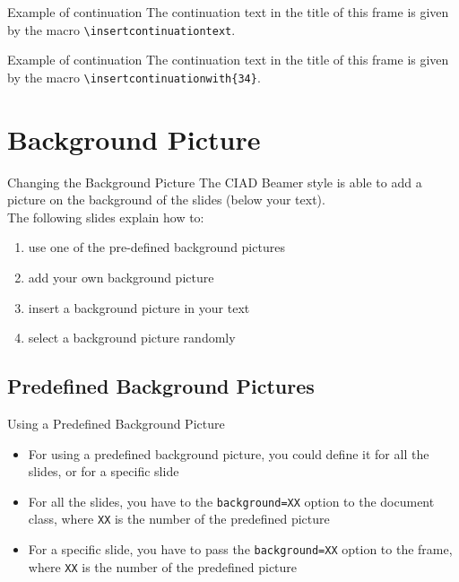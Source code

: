 \documentclass[english,sectioncirclenumberstyle]{ciadbeamer}
\begin{document}
\begin{frame}{Example of continuation \insertcontinuationtext}
	The continuation text in the title of this frame is given by the macro \texttt{{\textbackslash}insertcontinuationtext}.
\end{frame}

\begin{frame}{Example of continuation }
	The continuation text in the title of this frame is given by the macro \texttt{{\textbackslash}insertcontinuationwith\{34\}}.
\end{frame}


\section{Background Picture}
\tableofcontentslide[sectionstyle={show/shaded},subsectionstyle={show/show/hide},subsubsectionstyle={hide/hide/hide/hide},sections={1-6}]

\begin{frame}{Changing the Background Picture}
	The CIAD Beamer style is able to add a picture on the background of the slides (below your text). \\[.5cm]
	The following slides explain how to:
	\begin{enumerate}
		\item use one of the pre-defined background pictures
		\item add your own background picture
		\item insert a background picture in your text
		\item select a background picture randomly
	\end{enumerate}
\end{frame}

\subsection{Predefined Background Pictures}

\begin{frame}{Using a Predefined Background Picture}
	\begin{itemize}
		\item For using a predefined background picture, you could define it for all the slides, or for a specific slide \\[.5cm]
		\item For all the slides, you have to the \texttt{background=XX} option to the document class, where \texttt{XX} is the number of the predefined picture \\[.5cm]
		\item For a specific slide, you have to pass the \texttt{background=XX} option to the frame, where \texttt{XX} is the number of the predefined picture
	\end{itemize}
\end{frame}
\end{document}
